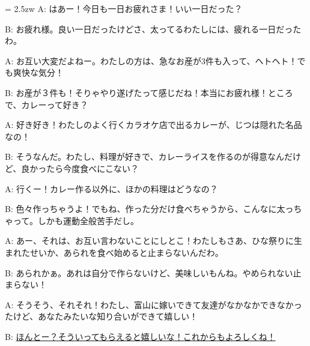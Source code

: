 \documentclass[11pt]{amsart}
\title{}
\author{}
\newenvironment{hangall}[1]{\hangindent = 2.5zw\everypar{\hangindent = 2.5zw}}{}
\begin{document}
\maketitle
\begin{hangall}{}%
A: はあー！今日も一日お疲れさま！いい一日だった？

B: お疲れ様。良い一日だったけどさ、太ってるわたしには、疲れる一日だったわ。

A: お互い大変だよねー。わたしの方は、急なお産が3件も入って、ヘトヘト！でも爽快な気分！

B: お産が３件も！そりゃやり遂げたって感じだね！本当にお疲れ様！ところで、カレーって好き？

A: 好き好き！わたしのよく行くカラオケ店で出るカレーが、じつは隠れた名品なの！

B: そうなんだ。わたし、料理が好きで、カレーライスを作るのが得意なんだけど、良かったら今度食べにこない？

A: 行くー！カレー作る以外に、ほかの料理はどうなの？

B: 色々作っちゃうよ！でもね、作った分だけ食べちゃうから、こんなに太っちゃって。しかも運動全般苦手だし。

A: あー、それは、お互い言わないことにしとこ！わたしもさあ、ひな祭りに生まれたせいか、あられを食べ始めると止まらないんだわ。

B: あられかぁ。あれは自分で作らないけど、美味しいもんね。やめられない止まらない！

A: そうそう、それそれ！わたし、富山に嫁いできて友達がなかなかできなかったけど、あなたみたいな知り合いができて嬉しい！

B: \ul{ほんとー？そういってもらえると嬉しいな！これからもよろしくね！}\end{hangall}
\end{document}
